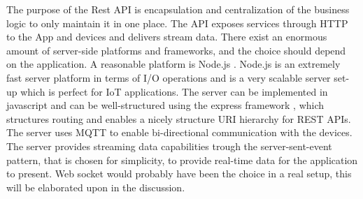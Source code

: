 The purpose of the Rest API is encapsulation and centralization of the business logic to only maintain it in one place. The API exposes services through HTTP to the App and devices and delivers stream data. There exist an enormous amount of server-side platforms and frameworks, and the choice should depend on the application. A reasonable platform is Node.js \cite{node}. Node.js is an extremely fast server platform in terms of I/O operations and is a very scalable server set-up which is perfect for IoT applications. The server can be implemented in javascript and can be well-structured using the express framework \cite{express}, which structures routing and enables a nicely structure URI hierarchy for REST APIs. The server uses MQTT to enable bi-directional communication with the devices. The server provides streaming data capabilities trough the server-sent-event pattern, that is chosen for simplicity, to provide real-time data for the application to present. Web socket would probably have been the choice in a real setup, this will be elaborated upon in the discussion.